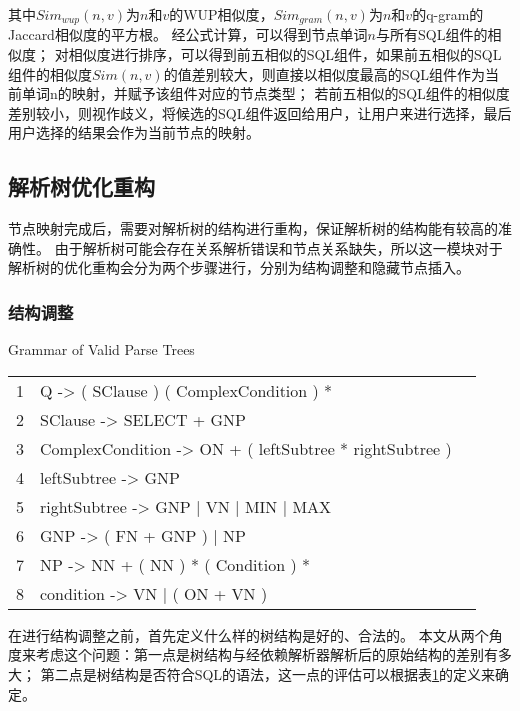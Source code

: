 其中$Sim_{wup}(n,v)$为$n$和$v$的WUP相似度\cite{wu1994verb}，$Sim_{gram}(n,v)$为$n$和$v$的q-gram的Jaccard相似度的平方根\cite{xiao2011efficient}。
经公式计算，可以得到节点单词$n$与所有SQL组件的相似度；
对相似度进行排序，可以得到前五相似的SQL组件，如果前五相似的SQL组件的相似度$Sim(n,v)$的值差别较大，则直接以相似度最高的SQL组件作为当前单词n的映射，并赋予该组件对应的节点类型；
若前五相似的SQL组件的相似度差别较小，则视作歧义，将候选的SQL组件返回给用户，让用户来进行选择，最后用户选择的结果会作为当前节点的映射。 


\subsection{解析树优化重构}
\label{nli:jxsyhcg}

节点映射完成后，需要对解析树的结构进行重构，保证解析树的结构能有较高的准确性。
由于解析树可能会存在关系解析错误和节点关系缺失，所以这一模块对于解析树的优化重构会分为两个步骤进行，分别为结构调整和隐藏节点插入。

\subsubsection{结构调整}

\begin{table}[!hpb]
  \centering
    {Grammar of Valid Parse Trees}
  \label{nli:hfjxsjggz}
  \begin{tabular}{@{}llr@{}} \toprule
    1  & 	Q -> ( SClause ) ( ComplexCondition ) *\\
    2  & 	SClause -> SELECT + GNP\\
    3  & 	ComplexCondition -> ON + ( leftSubtree * rightSubtree )\\
    4  & 	leftSubtree -> GNP\\
    5  & 	rightSubtree -> GNP | VN | MIN | MAX\\
    6  & 	GNP -> ( FN + GNP ) | NP\\
    7  & 	NP -> NN + ( NN ) * ( Condition ) *\\
    8  & 	condition -> VN | ( ON + VN )\\\bottomrule
  \end{tabular}
\end{table}

在进行结构调整之前，首先定义什么样的树结构是好的、合法的。
本文从两个角度来考虑这个问题：第一点是树结构与经依赖解析器解析后的原始结构的差别有多大；
第二点是树结构是否符合SQL的语法，这一点的评估可以根据表\ref{nli:hfjxsjggz}的定义来确定\cite{li2014constructing}。

